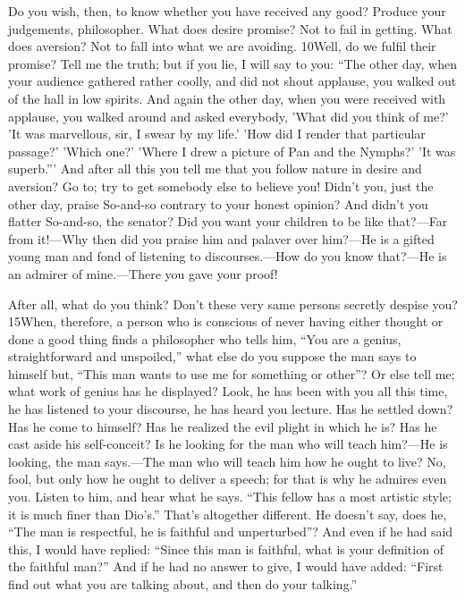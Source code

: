 Do you wish, then, to know whether you have received any good? Produce your judgements, philosopher. What does desire promise? Not to fail in getting. What does aversion? Not to fall into what we are avoiding. 10Well, do we fulfil their promise? Tell me the truth; but if you lie, I will say to you: ``The other day, when your audience gathered rather coolly, and did not shout applause, you walked out of the hall in low spirits. And again the other day, when you were received with applause, you walked around and asked everybody, 'What did you think of me?' 'It was marvellous, sir, I swear by my life.' 'How did I render that particular passage?' 'Which one?' 'Where I drew a picture of Pan and the Nymphs?' 'It was superb.''' And after all this you tell me that you follow nature in desire and aversion? Go to; try to get somebody else to believe you! Didn't you, just the other day, praise So-and-so contrary to your honest opinion? And didn't you flatter So-and-so, the senator? Did you want your children to be like that?—Far from it!—Why then did you praise him and palaver over him?—He is a gifted young man and fond of listening to discourses.—How do you know that?—He is an admirer of mine.—There you gave your proof!

After all, what do you think? Don't these very same persons secretly despise you? 15When, therefore, a person who is conscious of never having either thought or done a good thing finds a philosopher who tells him, ``You are a genius, straightforward and unspoiled,'' what else do you suppose the man says to himself but, ``This man wants to use me for something or other''? Or else tell me; what work of genius has he displayed? Look, he has been with you all this time, he has listened to your discourse, he has heard you lecture. Has he settled down? Has he come to himself? Has he realized the evil plight in which he is? Has he cast aside his self-conceit? Is he looking for the man who will teach him?—He is looking, the man says.—The man who will teach him how he ought to live? No, fool, but only how he ought to deliver a speech; for that is why he admires even you. Listen to him, and hear what he says. ``This fellow has a most artistic style; it is much finer than Dio's.'' That's altogether different. He doesn't say, does he, ``The man is respectful, he is faithful and unperturbed''? And even if he had said this, I would have replied: ``Since this man is faithful, what is your definition of the faithful man?'' And if he had no answer to give, I would have added: ``First find out what you are talking about, and then do your talking.''


